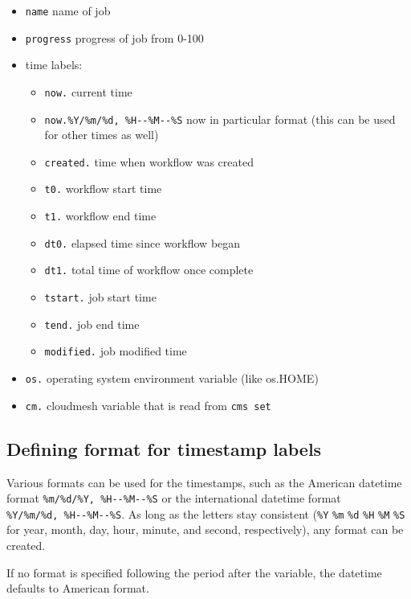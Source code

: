 \begin{itemize}
\item
  \texttt{name} name of job
\item
  \texttt{progress} progress of job from 0-100
\item
  time labels:

  \begin{itemize}
  \item
    \texttt{now.} current time
  \item
    \texttt{now.\%Y/\%m/\%d,\ \%H-\/-\%M-\/-\%S} now in particular
    format (this can be used for other times as well)
  \item
    \texttt{created.} time when workflow was created
  \item
    \texttt{t0.} workflow start time
  \item
    \texttt{t1.} workflow end time
  \item
    \texttt{dt0.} elapsed time since workflow began
  \item
    \texttt{dt1.} total time of workflow once complete
  \item
    \texttt{tstart.} job start time
  \item
    \texttt{tend.} job end time
  \item
    \texttt{modified.} job modified time
  \end{itemize}
\item
  \texttt{os.} operating system environment variable (like os.HOME)
\item
  \texttt{cm.} cloudmesh variable that is read from \texttt{cms\ set}
\end{itemize}

\subsection{Defining format for timestamp
labels}\label{defining-format-for-timestamp-labels}

Various formats can be used for the timestamps, such as the American
datetime format \texttt{\%m/\%d/\%Y,\ \%H-\/-\%M-\/-\%S} or the
international datetime format \texttt{\%Y/\%m/\%d,\ \%H-\/-\%M-\/-\%S}.
As long as the letters stay consistent (\texttt{\%Y} \texttt{\%m}
\texttt{\%d} \texttt{\%H} \texttt{\%M} \texttt{\%S} for year, month,
day, hour, minute, and second, respectively), any format can be created.

If no format is specified following the period after the variable, the
datetime defaults to American format.

